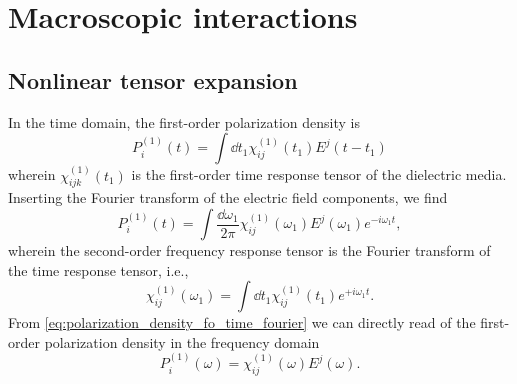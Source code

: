 \chapter{Macroscopic interactions}\label{app:macroscopic_interactions}

\section{Nonlinear tensor expansion}\label{sec:polarization_density_susceptibility}

In the time domain, the first-order polarization density is~\cite[p.~17]{Murti2014}
\begin{equation}
	P_i^{(1)}(t)
	=
	\int\dd{t_1}
	\chi^{(1)}_{ij}(t_1)
	E^j(t-t_1)
	\label{eq:polarization_density_fo_time}
\end{equation}
wherein $\chi^{(1)}_{ijk}(t_1)$ is the first-order time response tensor of the dielectric media.
Inserting the Fourier transform of the electric field components, we find
\begin{equation}
	P_i^{(1)}(t)
	=
	\int\frac{\dd{\omega_1}}{2\pi}
	\chi^{(1)}_{ij}(\omega_1)
	E^j(\omega_1)
	e^{-i\omega_1t}
	\label{eq:polarization_density_fo_time_fourier}
	,
\end{equation}
wherein the second-order frequency response tensor is the Fourier transform of the time response tensor, i.e.,
\begin{equation}
	\chi^{(1)}_{ij}(\omega_1)
	=
	\int\dd{t_1}
	\chi^{(1)}_{ij}(t_1)
	e^{+i\omega_1t}
	.
\end{equation}
From \cref{eq:polarization_density_fo_time_fourier} we can directly read of the first-order polarization density in the frequency domain
\begin{equation}
	P_i^{(1)}(\omega)
	=
	\chi^{(1)}_{ij}(\omega)
	E^j(\omega)
	.
	\label{eq:polarization_density_fo_freq}
\end{equation}

